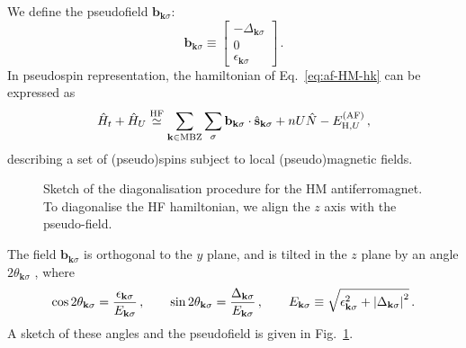 %
%

We define the pseudofield $\mathbf{b}_{\mathbf{k}\sigma}$:
\begin{equation}\label{eq:af-pseudofield-def}
\mathbf{b}_{\mathbf{k}\sigma} \equiv \begin{bmatrix}
	-\Delta_{\mathbf{k}\sigma} \\ 0 \\ \epsilon_{\mathbf{k}\sigma} 
\end{bmatrix} \, .
\end{equation}
In pseudospin representation, the hamiltonian of Eq.~\eqref{eq:af-HM-hk} can be expressed as
\begin{equation}\label{eq:af-hm-spin-h}
	\hat H_t + \hat H_U \stackrel{\mathrm{HF}}{\simeq} \sum_{\mathbf{k} \in \mathrm{MBZ}} \sum_\sigma \mathbf{b}_{\mathbf{k}\sigma} \cdot \hat{\mathbf{s}}_{\mathbf{k}\sigma} + nU \hat N - E_{\mathrm{H},U}^{(\mathrm{AF})} \, ,
\end{equation}
describing a set of (pseudo)spins subject to local (pseudo)magnetic fields. 
%
\begin{figure}
	\centering
	
	\caption{Sketch of the diagonalisation procedure for the HM antiferromagnet. To diagonalise the HF hamiltonian, we align the $z$ axis with the pseudo-field.}
	\label{fig:pseudo-magnetic-field-hm}
\end{figure}
%
The field $\mathbf{b}_{\mathbf{k}\sigma}$ is orthogonal to the $y$ plane, and is tilted in the $z$ plane by an angle $2\theta_{\mathbf{k}\sigma}$ , where
\[
\cos 2\theta_{\mathbf{k}\sigma} = \frac{\epsilon_{\mathbf{k}\sigma}}{E_{\mathbf{k}\sigma}} \, ,
\qquad
\sin 2\theta_{\mathbf{k}\sigma} = \frac{\Delta_{\mathbf{k}\sigma}}{E_{\mathbf{k}\sigma}} \, ,
\qquad
E_{\mathbf{k}\sigma} \equiv 	\sqrt{\epsilon_{\mathbf{k}\sigma}^2 + \abs{\Delta_{\mathbf{k}\sigma}}^2} \, .
\]
A sketch of these angles and the pseudofield is given in Fig.~\ref{fig:pseudo-magnetic-field-hm}.

